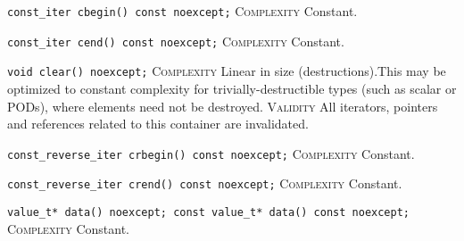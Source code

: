 \noindent{}\hspace*{0.25em}\lstinline[basicstyle=\ttfamily\color{cgreen}]{const_iter cbegin() const noexcept;} \textsc{Complexity} Constant.\\\vspace{-0.6em}

\noindent{}\hspace*{0.25em}\lstinline[basicstyle=\ttfamily\color{cgreen}]{const_iter cend() const noexcept;} \textsc{Complexity} Constant.\\\vspace{-0.6em}

\noindent{}\hspace*{0.25em}\lstinline[basicstyle=\ttfamily\color{corange}]{void clear() noexcept;} \textsc{Complexity} Linear in size (destructions).This may be optimized to constant complexity for trivially-destructible types (such as scalar or PODs), where elements need not be destroyed. \textsc{Validity} All iterators, pointers and references related to this container are invalidated.\\\vspace{-0.6em}

\noindent{}\hspace*{0.25em}\lstinline[basicstyle=\ttfamily\color{cgreen}]{const_reverse_iter crbegin() const noexcept;} \textsc{Complexity} Constant.\\\vspace{-0.6em}

\noindent{}\hspace*{0.25em}\lstinline[basicstyle=\ttfamily\color{cgreen}]{const_reverse_iter crend() const noexcept;} \textsc{Complexity} Constant.\\\vspace{-0.6em}

\noindent{}\hspace*{0.25em}\lstinline[basicstyle=\ttfamily\color{cgreen}]{value_t* data() noexcept; const value_t* data() const noexcept;} \textsc{Complexity} Constant.\\\vspace{-0.6em}

